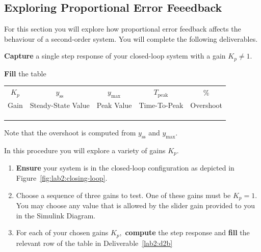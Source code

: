 \subsection{Exploring Proportional Error Feeedback}
For this section you will explore how proportional error feedback affects
the behaviour of a second-order system. You will complete the following
deliverables.
%
\begin{deliverable}[label={lab2:d2}]
  \textbf{Capture} a single step response of your closed-loop system
  with a gain \(K_p \neq 1.\)
\end{deliverable}
%
\begin{deliverable}[label={lab2:d2b}]
  \textbf{Fill} the table
  \begin{center}
  \begin{tabular}{c|c|c|c|c}
    \(K_p\)
      & \(y_\mathrm{ss}\)
      & \(y_\mathrm{max}\)
      & \(T_\mathrm{peak}\)
      & \(\%\) \\
    Gain
      & Steady-State Value
      & Peak Value
      & Time-To-Peak
      & Overshoot \\ \hline
    & & & & \\ \hline
    & & & & \\ \hline
    & & & &
  \end{tabular}
  \end{center}
  Note that the overshoot is computed from \(y_\mathrm{ss}\) and
  \(y_\mathrm{max}.\)
\end{deliverable}

%
\begin{procedure}[label={proc:lab2:p2}]
  In this procedure you will explore a variety of gains \(K_p.\)
  \begin{enumerate}[label=(\arabic*)]
    \item{
      \textbf{Ensure} your system is in the closed-loop configuration
      as depicted in Figure~\ref{fig:lab2:closing-loop}.
    }
    \item{
      Choose a sequence of three gains to test. One of these gains
      must be \(K_p = 1.\) You may choose any value that is allowed by
      the slider gain provided to you in the Simulink Diagram.
    }
    \item{
      For each of your chosen gains \(K_p,\) \textbf{compute} the step
      response and \textbf{fill} the relevant row of the table
      in Deliverable~\ref{lab2:d2b}
    }
  \end{enumerate}
\end{procedure}

